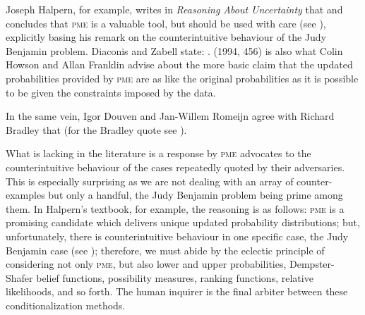 \documentclass[phd,12pt,oneside]{ubcthesis}
\begin{document}
Joseph Halpern, for example, writes in \emph{Reasoning About
  Uncertainty} that   and
concludes that \textsc{pme} is a valuable tool, but should be used
with care (see ), explicitly basing his
remark on the counterintuitive behaviour of the Judy Benjamin problem.
Diaconis and Zabell state: 
.  (1994, 456) is
also what Colin Howson and Allan Franklin advise about the more basic
claim that the updated probabilities provided by \textsc{pme} are as
like the original probabilities as it is possible to be given the
constraints imposed by the data.

In the same vein, Igor Douven and Jan-Willem Romeijn agree with
Richard Bradley that  
(for the Bradley quote see ).

What is lacking in the literature is a response by \textsc{pme}
advocates to the counterintuitive behaviour of the cases repeatedly
quoted by their adversaries. This is especially surprising as we are
not dealing with an array of counter-examples but only a handful, the
Judy Benjamin problem being prime among them. In Halpern's textbook,
for example, the reasoning is as follows: \textsc{pme} is a
promising candidate which delivers unique updated probability
distributions; but, unfortunately, there is counterintuitive behaviour
in one specific case, the Judy Benjamin case (see
); therefore, we must abide by the
eclectic principle of considering not only \textsc{pme}, but also
lower and upper probabilities, Dempster-Shafer belief functions,
possibility measures, ranking functions, relative likelihoods, and so
forth. The human inquirer is the final arbiter between these
conditionalization methods.
\end{document}
